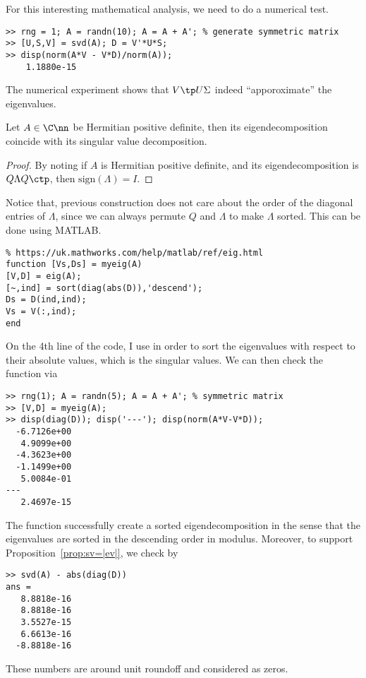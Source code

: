 \documentclass{article}
\def\sign{\mathrm{sign}}
\begin{document}
For this interesting mathematical analysis, we need to do a numerical test.
\begin{lstlisting}[numbers=none]
>> rng = 1; A = randn(10); A = A + A'; % generate symmetric matrix
>> [U,S,V] = svd(A); D = V'*U*S;
>> disp(norm(A*V - V*D)/norm(A));
    1.1880e-15
\end{lstlisting}
The numerical experiment shows that  $V\tp U \Sigma$ indeed
``apporoximate'' the eigenvalues.  




\begin{corollary} \label{cor:svd=evd} Let $A\in\C\nn$ be Hermitian positive
definite, then its eigendecomposition coincide with its singular value
decomposition.
\end{corollary}

\begin{proof}
By noting if $A$ is Hermitian positive definite, and its eigendecomposition
is $Q\Lambda Q\ctp$, then $\sign(\Lambda) = I$.
\end{proof}

Notice that, previous construction does not care about the order of the
diagonal entries of $\Lambda$, since we can always permute $Q$ and
$\Lambda$ to make $\Lambda$ sorted. This can be done using MATLAB.

\begin{lstlisting}
% https://uk.mathworks.com/help/matlab/ref/eig.html
function [Vs,Ds] = myeig(A)
[V,D] = eig(A);
[~,ind] = sort(diag(abs(D)),'descend');
Ds = D(ind,ind);
Vs = V(:,ind);
end 
\end{lstlisting}
On the 4th line of the code, I use  in order to sort the
eigenvalues with respect to their absolute values, which is the singular
values. We can then check the function via
\begin{lstlisting}[numbers=none]
>> rng(1); A = randn(5); A = A + A'; % symmetric matrix
>> [V,D] = myeig(A); 
>> disp(diag(D)); disp('---'); disp(norm(A*V-V*D));
  -6.7126e+00
   4.9099e+00
  -4.3623e+00
  -1.1499e+00
   5.0084e-01
---
   2.4697e-15
\end{lstlisting}
The function  successfully create a sorted eigendecomposition
in the sense that the eigenvalues are sorted in the descending order in
modulus. Moreover, to support Proposition~\ref{prop:sv=|ev|}, we check by
\begin{lstlisting}[numbers=none]
>> svd(A) - abs(diag(D))
ans =
   8.8818e-16
   8.8818e-16
   3.5527e-15
   6.6613e-16
  -8.8818e-16
\end{lstlisting}
These numbers are around unit roundoff and considered as zeros.
\end{document}
